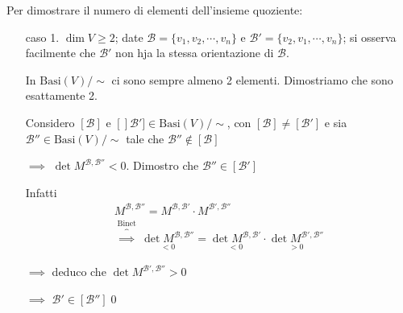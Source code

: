 {\begin{itemize}
        Per dimostrare il numero di elementi dell'insieme quoziente: 
        \begin{itemize}
            \item [caso 1.] $ \dim  V \ge 2 $; date $ \mathscr{B}=\{v_1, v_2, \cdots, v_{n} \} $ e $ \mathscr{B}'=\{v_2, v_1, \cdots, v_n\} $; si osserva facilmente che $ \mathscr{B}' $ non hja la stessa orientazione di $ \mathscr{B} $.
            
            In $ \text{Basi}(V)/\sim $ ci sono sempre almeno 2 elementi. Dimostriamo che sono esattamente 2.

            Considero $ [ \mathscr{B}] $ e $ []\mathscr{B}'] \in \text{Basi}(V)/\sim $, con $ [ \mathscr{B}]\neq [ \mathscr{B}'] $ e sia $ \mathscr{B}'' \in \text{Basi}(V)/\sim $ tale che $ \mathscr{B}'' \notin [ \mathscr{B}] $ 
            
            $\implies$ $ \det M^{ \mathscr{B}, \mathscr{B}''}<0 $. Dimostro che $ \mathscr{B}'' \in [ \mathscr{B}'] $

            Infatti \begin{multline*}
                M^{ \mathscr{B}, \mathscr{B}''}= M^{ \mathscr{B}, \mathscr{B}'} \cdot M^{ \mathscr{B}', \mathscr{B}''} \\
                \overset{\text{Binet}}{\overbrace{\implies}}\, \underset{<0}{\det M^{ \mathscr{B}, \mathscr{B}''}} = \underset{<0}{\det M ^{ \mathscr{B}, \mathscr{B}'}} \cdot \underset{>0}{\det M^{ \mathscr{B}', \mathscr{B}''}}
            \end{multline*}
            
            $\implies$ deduco che $ \det M^{ \mathscr{B}', \mathscr{B}''}>0 $ 
            
            $\implies$ $ \mathscr{B}' \in [ \mathscr{B}''] $\qed
        \end{itemize}

    \end{itemize}
}